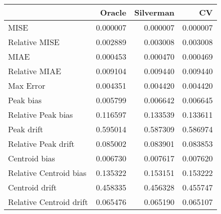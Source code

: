\begin{tabular}{lrrr}
  \hline
 & Oracle & Silverman & CV \\ 
  \hline
MISE & 0.000007 & 0.000007 & 0.000007 \\ 
  Relative MISE & 0.002889 & 0.003008 & 0.003008 \\ 
  MIAE & 0.000453 & 0.000470 & 0.000469 \\ 
  Relative MIAE & 0.009104 & 0.009440 & 0.009440 \\ 
  Max Error & 0.004351 & 0.004420 & 0.004420 \\ 
  Peak bias & 0.005799 & 0.006642 & 0.006645 \\ 
  Relative Peak bias & 0.116597 & 0.133539 & 0.133611 \\ 
  Peak drift & 0.595014 & 0.587309 & 0.586974 \\ 
  Relative Peak drift & 0.085002 & 0.083901 & 0.083853 \\ 
  Centroid bias & 0.006730 & 0.007617 & 0.007620 \\ 
  Relative Centroid bias & 0.135322 & 0.153151 & 0.153222 \\ 
  Centroid drift & 0.458335 & 0.456328 & 0.455747 \\ 
  Relative Centroid drift & 0.065476 & 0.065190 & 0.065107 \\ 
   \hline
\end{tabular}
